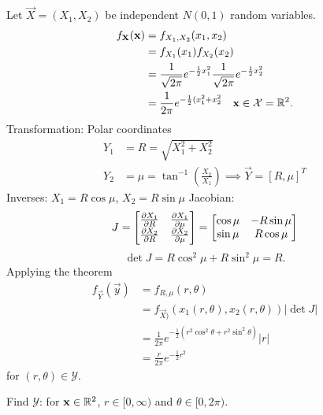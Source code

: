 \documentclass[10pt, a4paper]{article}
\begin{document}
\begin{example}
    Let $\vec{X} = (X_1, X_2)$ be independent $N(0, 1)$ random variables.
    \begin{align*}
        f_{\vec{X}}(\vec{x}) &= f_{X_1, X_2}(x_1, x_2) \\
        &= f_{X_1}(x_1)f_{X_2}(x_2) \\
        &= \frac{1}{\sqrt{2\pi}}e ^ {-\frac{1}{2}x_1 ^ 2}\frac{1}{\sqrt{2\pi}}e ^ {-\frac{1}{2}x_2 ^ 2} \\
        &= \frac{1}{2\pi}e ^ {-\frac{1}{2}(x_1 ^ 2 + x_2 ^ 2}\quad\vec{x} \in \mathcal{X} = \R ^ 2.
    \end{align*}
    Transformation:
    Polar coordinates
    \begin{align*}
        Y_1 &= R = \sqrt{X_1 ^ 2 + X_2 ^ 2} \\
        Y_2 &= \mu = \tan ^ {-1}\left(\frac{X_2}{X_1}\right) \implies \vec{Y} = [R, \mu] ^ T
    \end{align*}
    Inverses:
    $X_1 = R\cos{\mu}$,
    $X_2 = R\sin{\mu}$
    Jacobian:
    \[
    J = \begin{bmatrix}
        \pd[X_1]{R} & \pd[X_1]{\mu} \\
        \pd[X_2]{R} & \pd[X_2]{\mu}
    \end{bmatrix}
    = \begin{bmatrix}
        \cos{\mu} & -R\sin{\mu} \\
        \sin{\mu} & R\cos{\mu}
    \end{bmatrix}
    \]
    \[
    \det{J} = R\cos ^ 2{\mu} + R\sin ^ 2{\mu} = R.
    \]
    Applying the theorem
    \begin{align*}
        f_{\vec{Y}}(\vec{y}) &= f_{R, \mu}(r, \theta) \\
        &= f_{\vec{X})}(x_1(r, \theta), x_2(r, \theta))|\det{J}| \\&
        = \frac{1}{2\pi}e ^ {-\frac{1}{2}(r ^ 2\cos ^ 2\theta + r ^ 2\sin ^ 2\theta)}|r| \\
        &= \frac{r}{2\pi}e ^ {-\frac{1}{2}r ^ 2}
    \end{align*}
    for $(r, \theta) \in \mathcal{Y}$.

    Find $\mathcal{Y}$:
    for $\vec{x} \in \R ^ 2$,
    $r \in [0, \infty)$ and $\theta \in [0, 2\pi)$.
\end{example}
\end{document}
